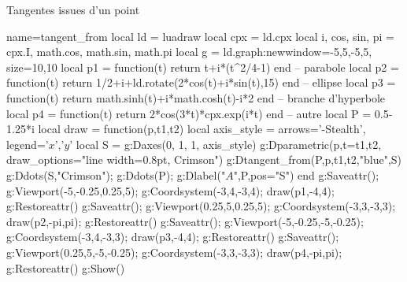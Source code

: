 \begin{demo}{Tangentes issues d'un point}
\begin{luadraw}{name=tangent_from}
local ld = luadraw
local cpx = ld.cpx
local i, cos, sin, pi = cpx.I, math.cos, math.sin, math.pi
local g = ld.graph:new{window={-5,5,-5,5}, size={10,10}}
local p1 = function(t) return t+i*(t^2/4-1) end -- parabole
local p2 = function(t) return 1/2+i+ld.rotate(2*cos(t)+i*sin(t),15) end -- ellipse
local p3 = function(t) return math.sinh(t)+i*math.cosh(t)-i*2 end -- branche d'hyperbole
local p4 = function(t) return 2*cos(3*t)*cpx.exp(i*t) end -- autre
local P = 0.5-1.25*i
local draw = function(p,t1,t2)
    local axis_style = { arrows='-Stealth', legend={'$x$','$y$'} }
    local S = {}
    g:Daxes({0, 1, 1}, axis_style)
    g:Dparametric(p,{t={t1,t2}, draw_options="line width=0.8pt, Crimson"})
    g:Dtangent_from(P,p,t1,t2,"blue",S)
    g:Ddots(S,"Crimson"); g:Ddots(P); g:Dlabel("$A$",P,{pos="S"})
end
g:Saveattr(); g:Viewport(-5,-0.25,0.25,5); g:Coordsystem(-3,4,-3,4); draw(p1,-4,4); g:Restoreattr()
g:Saveattr(); g:Viewport(0.25,5,0.25,5); g:Coordsystem(-3,3,-3,3); draw(p2,-pi,pi); g:Restoreattr()
g:Saveattr(); g:Viewport(-5,-0.25,-5,-0.25); g:Coordsystem(-3,4,-3,3); draw(p3,-4,4); g:Restoreattr()
g:Saveattr(); g:Viewport(0.25,5,-5,-0.25); g:Coordsystem(-3,3,-3,3); draw(p4,-pi,pi); g:Restoreattr()
g:Show()
\end{luadraw}
\end{demo}

